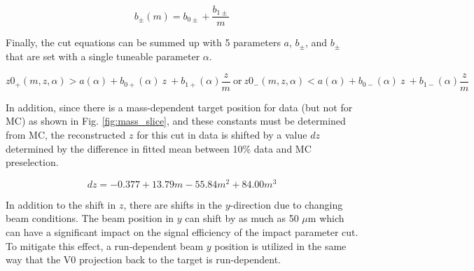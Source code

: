 \begin{equation}
    b_{\pm}(m) = b_{0\pm} + \frac{b_{1\pm}}{m}
    \label{equ:z0_cut_m}
\end{equation}

Finally, the cut equations can be summed up with 5 parameters $a$, $b_{\pm}$, and $b_{\pm}$ that are set with a single tuneable parameter $\alpha$.

\begin{equation}
    z0_+(m,z,\alpha) > a(\alpha) + b_{0+}(\alpha) \ z \ +  b_{1+}(\alpha) \frac{z}{m} \ \mathrm{or} \
    z0_-(m,z,\alpha) < a(\alpha) + b_{0-}(\alpha) \ z \ +  b_{1-}(\alpha) \frac{z}{m} 
    \label{equ:z0_cut_final}
\end{equation}

In addition, since there is a mass-dependent target position for data (but not for MC) as shown in Fig. \ref{fig:mass_slice}, and these constants must be determined from MC, the reconstructed $z$ for this cut in data is shifted by a value $dz$ determined by the difference in fitted mean between 10\% data and MC preselection.

\begin{equation}
    dz = -0.377 + 13.79 m - 55.84 m^2 + 84.00 m^3
    \label{equ:meanz_pre}
\end{equation}

In addition to the shift in $z$, there are shifts in the $y$-direction due to changing beam conditions. The beam position in $y$ can shift by as much as 50 $\mu$m which can have a significant impact on the signal efficiency of the impact parameter cut. To mitigate this effect, a run-dependent beam $y$ position is utilized in the same way that the V0 projection back to the target is run-dependent.


